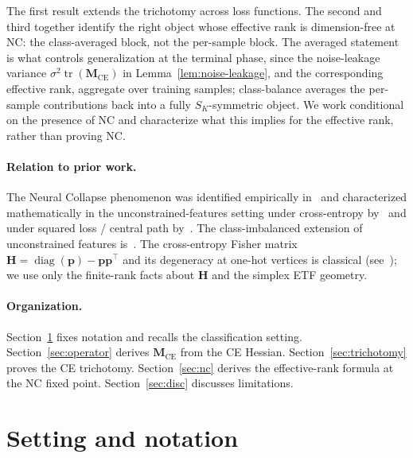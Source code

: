 \documentclass[12pt]{amsart}
\theoremstyle{definition}
\theoremstyle{remark}
\DeclareMathOperator{\tr}{tr}
\DeclareMathOperator{\diag}{diag}
\newcommand{\bM}{\mathbf{M}}
\newcommand{\bp}{\mathbf{p}}
\newcommand{\bH}{\mathbf{H}}
\begin{document}
The first result extends the trichotomy across loss functions. The
second and third together identify the right object whose effective
rank is dimension-free at NC: the class-averaged block, not the
per-sample block. The averaged statement is what controls
generalization at the terminal phase, since the noise-leakage
variance $\sigma^{2}\tr(\bM_{\mathrm{CE}})$ in
Lemma~\ref{lem:noise-leakage}, and the corresponding effective rank,
aggregate over training samples; class-balance averages the
per-sample contributions back into a fully $S_{K}$-symmetric object.
We work conditional on the presence of NC and characterize what
this implies for the effective rank, rather than proving NC.

\paragraph{Relation to prior work.}
The Neural Collapse phenomenon was identified empirically
in~\cite{papyan2020} and characterized mathematically in
the unconstrained-features setting under cross-entropy
by~\cite{lu2022, mixon2022} and under squared loss / central path
by~\cite{han2022}. The class-imbalanced extension of unconstrained
features is~\cite{Fang2021}. The cross-entropy Fisher matrix
$\bH = \diag(\bp) - \bp\bp^{\top}$ and its degeneracy at one-hot
vertices is classical (see~\cite{Amari2016}); we use only the
finite-rank facts about $\bH$ and the simplex ETF geometry.

\paragraph{Organization.}
Section~\ref{sec:setting} fixes notation and recalls the
classification setting. Section~\ref{sec:operator} derives
$\bM_{\mathrm{CE}}$ from the CE Hessian. Section~\ref{sec:trichotomy}
proves the CE trichotomy. Section~\ref{sec:nc} derives the
effective-rank formula at the NC fixed point. Section~\ref{sec:disc}
discusses limitations.

\section{Setting and notation}\label{sec:setting}
\end{document}
